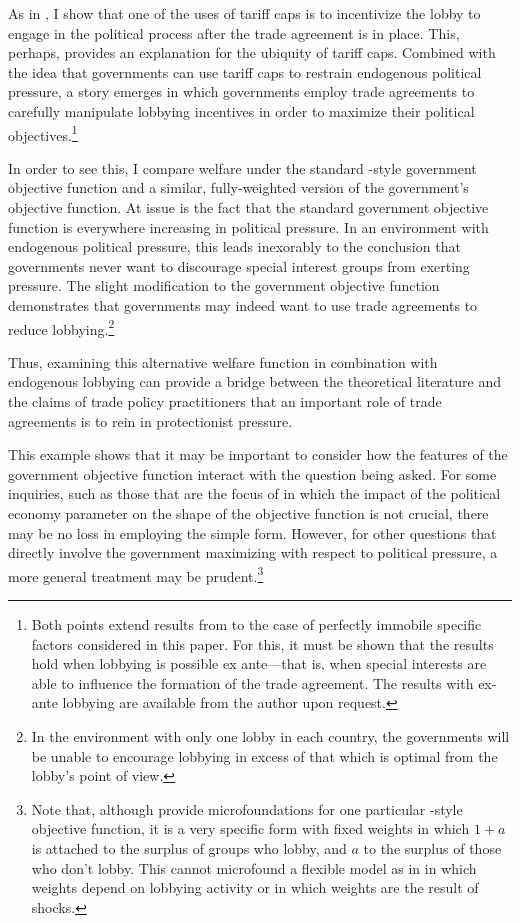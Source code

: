 As in \Textcite{mrc2007}, I show that one of the uses of tariff caps is to incentivize the lobby to engage in the political process after the trade agreement is in place. This, perhaps, provides an explanation for the ubiquity of tariff caps. Combined with the idea that governments can use tariff caps to restrain endogenous political pressure, a story emerges in which governments employ trade agreements to carefully manipulate lobbying incentives in order to maximize their political objectives.\footnote{Both points extend results from \Textcite{mrc2007} to the case of perfectly immobile specific factors considered in this paper. For this, it must be shown that the results hold when lobbying is possible ex ante---that is, when special interests are able to influence the formation of the trade agreement. The results with ex-ante lobbying are available from the author upon request.}

	
In order to see this, I compare welfare under the standard \Textcite{baldwin}-style government objective function and a similar, fully-weighted version of the government's objective function. At issue is the fact that the standard government objective function is everywhere increasing in political pressure. In an environment with endogenous political pressure, this leads inexorably to the conclusion that governments never want to discourage special interest groups from exerting pressure. The slight modification to the government objective function demonstrates that governments may indeed want to use trade agreements to reduce lobbying.\footnote{In the environment with only one lobby in each country, the governments will be unable to encourage lobbying in excess of that which is optimal from the lobby's point of view.}

Thus, examining this alternative welfare function in combination with endogenous lobbying can provide a bridge between the theoretical literature and the claims of trade policy practitioners that an important role of trade agreements is to rein in protectionist pressure.

This example shows that it may be important to consider how the features of the government objective function interact with the question being asked. For some inquiries, such as those that are the focus of \Textcite{ms2011, ms2012a} in which the impact of the political economy parameter on the shape of the objective function is not crucial, there may be no loss in employing the simple form. However, for other questions that directly involve the government maximizing with respect to political pressure, a more general treatment may be prudent.\footnote{Note that, although \Textcite{gh94} provide microfoundations for one particular \Textcite{baldwin}-style objective function, it is a very specific form with fixed weights in which $1+a$ is attached to the surplus of groups who lobby, and $a$ to the surplus of those who don't lobby. This cannot microfound a flexible model as in \Textcite{longvousden} in which weights depend on lobbying activity or in which weights are the result of shocks.}

